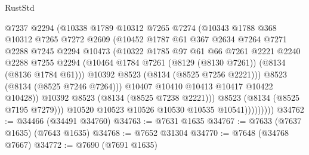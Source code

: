 \begin{lexlean}{RustStd}
\begin{coremodule}
{\begin{coremodule}
{{{{{{{{{{{{{{{{{{{{{{{{{{{{{{{{{{{{{{{{{{{{{{{{{{{{{                          @7237
                          @2294
                          (@10338
                            @1789
                            @10312
                            @7265
                            @7274
                            (@10343
                              @1788
                              @368
                              @10312
                              @7265
                              @7272
                              @2609
                              (@10452
                                @1787
                                @61
                                @367
                                @2634
                                @7264
                                @7271
                                @2288
                                @7245
                                @2294
                                @10473
                                (@10322
                                  @1785
                                  @97
                                  @61
                                  @66
                                  @7261
                                  @2221
                                  @2240
                                  @2288
                                  @7255
                                  @2294
                                  (@10464
                                    @1784
                                    @7261
                                    (@8129 (@8130 @7261))
                                    (@8134 (@8136 @1784 @61)))
                                  @10392
                                  @8523
                                  (@8134 (@8525 @7256 @2221)))
                                @8523
                                (@8134 (@8525 @7246 @7264)))
                              @10407
                              @10410
                              @10413
                              @10417
                              @10422
                              @10428))
                          @10392
                          @8523
                          (@8134 (@8525 @7238 @2221)))
                        @8523
                        (@8134 (@8525 @7195 @7279)))
                      @10520
                      @10523
                      @10526
                      @10530
                      @10535
                      @10541)))))))))
@34762 := @34466 (@34491 @34760)
@34763 := @7631 @1635
@34767 := @7633 (@7637 @1635) (@7643 @1635)
@34768 := @7652 @31304
@34770 := @7648 (@34768 @7667)
@34772 := @7690 (@7691 @1635)
}}}}}}}}}}}}}}}}}}}}}}}}}}}}}}}}}}}}}}}}}}}}}}}}}}}}}
\end{coremodule}}
\end{coremodule}
\end{lexlean}
